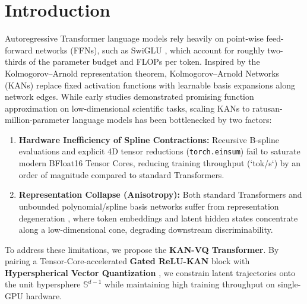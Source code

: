 \documentclass[11pt,a4paper]{article}
\newcommand{\Sphere}{\mathbb{S}^{d-1}}
\begin{document}
\section{Introduction}
Autoregressive Transformer language models rely heavily on point-wise feed-forward networks (FFNs), such as SwiGLU \cite{shazeer2020glu}, which account for roughly two-thirds of the parameter budget and FLOPs per token. Inspired by the Kolmogorov--Arnold representation theorem, Kolmogorov--Arnold Networks (KANs) \cite{liu2024kan} replace fixed activation functions with learnable basis expansions along network edges. While early studies demonstrated promising function approximation on low-dimensional scientific tasks, scaling KANs to ratusan-million-parameter language models has been bottlenecked by two factors:
\begin{enumerate}
    \item \textbf{Hardware Inefficiency of Spline Contractions:} Recursive B-spline evaluations and explicit 4D tensor reductions (\texttt{torch.einsum}) fail to saturate modern BFloat16 Tensor Cores, reducing training throughput (`tok/s`) by an order of magnitude compared to standard Transformers.
    \item \textbf{Representation Collapse (Anisotropy):} Both standard Transformers and unbounded polynomial/spline basis networks suffer from representation degeneration \cite{gao2019representation}, where token embeddings and latent hidden states concentrate along a low-dimensional cone, degrading downstream discriminability.
\end{enumerate}

To address these limitations, we propose the \textbf{KAN-VQ Transformer}. By pairing a Tensor-Core-accelerated \textbf{Gated ReLU-KAN} block \cite{qiu2024relukan} with \textbf{Hyperspherical Vector Quantization} \cite{van2017neural}, we constrain latent trajectories onto the unit hypersphere $\Sphere$ while maintaining high training throughput on single-GPU hardware.
\end{document}
